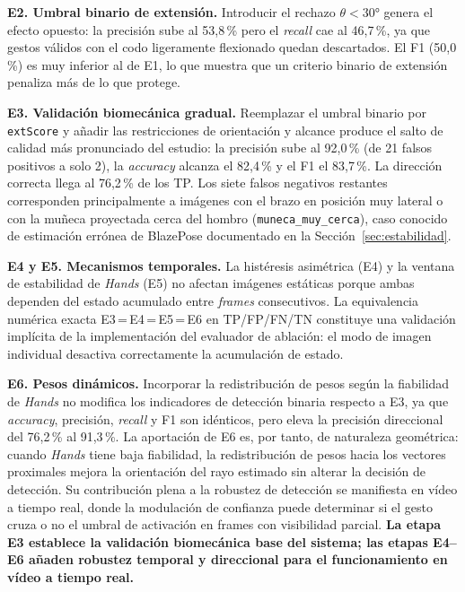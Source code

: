 \documentclass[12pt]{report} %
\begin{document}
\textbf{E2. Umbral binario de extensión.} Introducir el rechazo $\theta < 30°$ genera el efecto opuesto: la precisión sube al 53{,}8\,\% pero el \textit{recall} cae al 46{,}7\,\%, ya que gestos válidos con el codo ligeramente flexionado quedan descartados. El F1 (50{,}0\,\%) es muy inferior al de E1, lo que muestra que un criterio binario de extensión penaliza más de lo que protege.

\textbf{E3. Validación biomecánica gradual.} Reemplazar el umbral binario por \texttt{extScore} y añadir las restricciones de orientación y alcance produce el salto de calidad más pronunciado del estudio: la precisión sube al 92{,}0\,\% (de 21 falsos positivos a solo 2), la \textit{accuracy} alcanza el 82{,}4\,\% y el F1 el 83{,}7\,\%. La dirección correcta llega al 76{,}2\,\% de los TP. Los siete falsos negativos restantes corresponden principalmente a imágenes con el brazo en posición muy lateral o con la muñeca proyectada cerca del hombro (\texttt{muneca\_muy\_cerca}), caso conocido de estimación errónea de BlazePose documentado en la Sección~\ref{sec:estabilidad}.

\textbf{E4 y E5. Mecanismos temporales.} La histéresis asimétrica (E4) y la ventana de estabilidad de \textit{Hands} (E5) no afectan imágenes estáticas porque ambas dependen del estado acumulado entre \textit{frames} consecutivos. La equivalencia numérica exacta E3\,=\,E4\,=\,E5\,=\,E6 en TP/FP/FN/TN constituye una validación implícita de la implementación del evaluador de ablación: el modo de imagen individual desactiva correctamente la acumulación de estado.

\textbf{E6. Pesos dinámicos.} Incorporar la redistribución de pesos según la fiabilidad de \textit{Hands} no modifica los indicadores de detección binaria respecto a E3, ya que \textit{accuracy}, precisión, \textit{recall} y F1 son idénticos, pero eleva la precisión direccional del 76{,}2\,\% al 91{,}3\,\%. La aportación de E6 es, por tanto, de naturaleza geométrica: cuando \textit{Hands} tiene baja fiabilidad, la redistribución de pesos hacia los vectores proximales mejora la orientación del rayo estimado sin alterar la decisión de detección. Su contribución plena a la robustez de detección se manifiesta en vídeo a tiempo real, donde la modulación de confianza puede determinar si el gesto cruza o no el umbral de activación en frames con visibilidad parcial. \textbf{La etapa E3 establece la validación biomecánica base del sistema; las etapas E4--E6 añaden robustez temporal y direccional para el funcionamiento en vídeo a tiempo real.}
\end{document}
